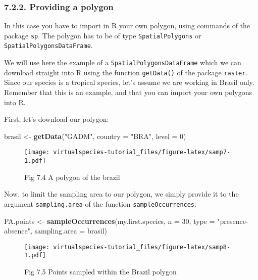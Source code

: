 \documentclass[]{article}
\newenvironment{Shaded}{\begin{snugshade}}{\end{snugshade}}
\newcommand{\KeywordTok}[1]{\textcolor[rgb]{0.13,0.29,0.53}{\textbf{#1}}}
\newcommand{\DataTypeTok}[1]{\textcolor[rgb]{0.13,0.29,0.53}{#1}}
\newcommand{\DecValTok}[1]{\textcolor[rgb]{0.00,0.00,0.81}{#1}}
\newcommand{\StringTok}[1]{\textcolor[rgb]{0.31,0.60,0.02}{#1}}
\newcommand{\NormalTok}[1]{#1}
\begin{document}
\subsubsection{7.2.2. Providing a polygon}\label{providing-a-polygon}

In this case you have to import in R your own polygon, using commands of
the package \texttt{sp}. The polygon has to be of type
\texttt{SpatialPolygons} or \texttt{SpatialPolygonsDataFrame}.

We will use here the example of a \texttt{SpatialPolygonsDataFrame}
which we can download straight into R using the function
\texttt{getData()} of the package \texttt{raster}. Since our species is
a tropical species, let's assume we are working in Brasil only. Remember
that this is an example, and that you can import your own polygons into
R.

First, let's download our polygon:

\begin{Shaded}
\begin{Highlighting}[]
\NormalTok{brasil <-}\StringTok{ }\KeywordTok{getData}\NormalTok{(}\StringTok{"GADM"}\NormalTok{, }\DataTypeTok{country =} \StringTok{"BRA"}\NormalTok{, }\DataTypeTok{level =} \DecValTok{0}\NormalTok{)}
\end{Highlighting}
\end{Shaded}

\begin{figure}
\centering
\texttt{[image: virtualspecies-tutorial\_files/figure-latex/samp7-1.pdf]}
\caption{Fig 7.4 A polygon of the brazil}
\end{figure}

Now, to limit the sampling area to our polygon, we simply provide it to
the argument \texttt{sampling.area} of the function
\texttt{sampleOccurrences}:

\begin{Shaded}
\begin{Highlighting}[]
\NormalTok{PA.points <-}\StringTok{ }\KeywordTok{sampleOccurrences}\NormalTok{(my.first.species,}
                               \DataTypeTok{n =} \DecValTok{30}\NormalTok{,}
                               \DataTypeTok{type =} \StringTok{"presence-absence"}\NormalTok{,}
                               \DataTypeTok{sampling.area =}\NormalTok{ brasil)}
\end{Highlighting}
\end{Shaded}

\begin{figure}
\centering
\texttt{[image: virtualspecies-tutorial\_files/figure-latex/samp8-1.pdf]}
\caption{Fig 7.5 Points sampled within the Brazil polygon}
\end{figure}
\end{document}
